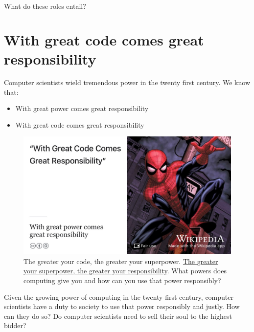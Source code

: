 \documentclass[
]{book}
\providecommand{\tightlist}{%
  \setlength{\itemsep}{0pt}\setlength{\parskip}{0pt}}
\begin{document}
What do these roles entail?

\hypertarget{peterparker}{%
\section{With great code comes great responsibility}\label{peterparker}}

Computer scientists wield tremendous power in the twenty first century. We know that:

\begin{itemize}
\tightlist
\item
  With great power comes great responsibility \citep{spiderman}
\item
  With great code comes great responsibility \citep{responsiblecs}
\end{itemize}

\begin{figure}

{\centering \includegraphics[width=1\linewidth]{images/with-great-code-comes-great-responsibility} 

}

\caption{The greater your code, the greater your superpower. \href{https://en.wikipedia.org/wiki/With_great_power_comes_great_responsibility}{The greater your superpower, the greater your responsibility}. What powers does computing give you and how can you use that power responsibly? \citep{spiderman, responsiblecs, Shapiro2021}}\label{fig:spiderman-fig}
\end{figure}



Given the growing power of computing in the twenty-first century, computer scientists have a duty to society to use that power responsibly and justly. How can they do so? Do computer scientists need to sell their soul to the highest bidder?
\end{document}
